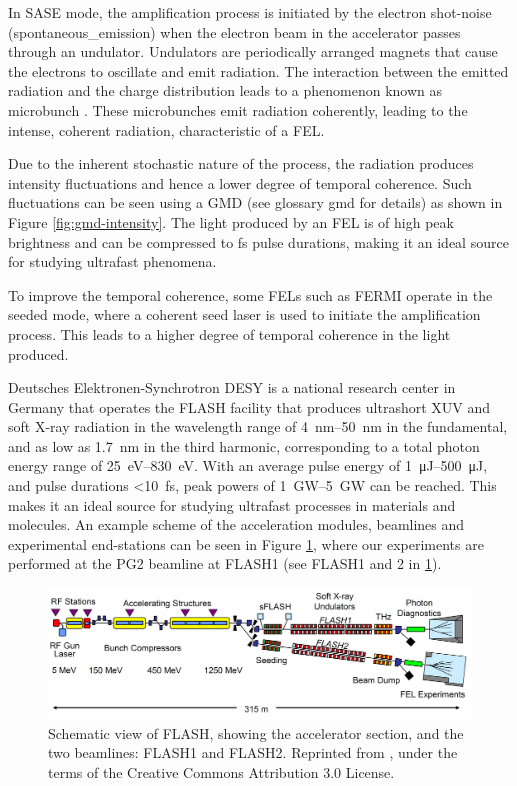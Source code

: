 In \gls{SASE} mode, the amplification process is initiated by the electron shot-noise (\gls{spontaneous_emission}) when the electron beam in the accelerator passes through an undulator. Undulators are periodically arranged magnets that cause the electrons to oscillate and emit radiation. The interaction between the emitted radiation and the charge distribution leads to a phenomenon known as \gls{microbunch} \cite{ackermannOperationFreeelectronLaser2007}. These microbunches emit radiation coherently, leading to the intense, coherent radiation, characteristic of a \gls{FEL}. 

Due to the inherent stochastic nature of the process, the radiation produces intensity fluctuations and hence a lower degree of temporal coherence. Such fluctuations can be seen using a \gls{GMD} (see glossary \gls{gmd} for details) as shown in Figure \ref{fig:gmd-intensity}. The light produced by an \gls{FEL} is of high peak brightness and can be compressed to \unit{fs} pulse durations, making it an ideal source for studying ultrafast phenomena.

To improve the temporal coherence, some \glspl{FEL} such as FERMI \cite{svandrlikDevelopmentPerspectivesFERMI2017} operate in the seeded mode, where a coherent seed laser is used to initiate the amplification process. This leads to a higher degree of temporal coherence in the light produced.

Deutsches Elektronen-Synchrotron DESY is a national research center in Germany that operates the \gls{FLASH} facility \cite{ackermannOperationFreeelectronLaser2007,tiedtkeSoftXrayFreeelectron2009} that produces ultrashort \gls{XUV} and soft X-ray radiation in the wavelength range of \qtyrange{4}{50}{\nm} in the fundamental, and as low as \qty{1.7}{\nm} in the third harmonic, corresponding to a total photon energy range of \qtyrange{25}{830}{\eV}. With an average pulse energy of \qtyrange{1}{500}{\micro\joule}, and pulse durations \qty{<10}{\fs}, peak powers of \qtyrange{1}{5}{\giga\watt} can be reached. This makes it an ideal source for studying ultrafast processes in materials and molecules. An example scheme of the acceleration modules, \glspl{beamline} and experimental end-stations can be seen in Figure \ref{fig:flash-schematic}, where our experiments are performed at the PG2 beamline at FLASH1 (see FLASH1 and 2 in \cref{fig:flash-schematic}).

\begin{figure}
    \includegraphics[width=1\linewidth]{images/flash_fel.png}
    \caption{Schematic view of \gls{FLASH}, showing the accelerator section, and the two beamlines: FLASH1 and FLASH2. Reprinted from \cite{faatzSimultaneousOperationTwo2016}, under the terms of the Creative Commons Attribution 3.0 License.}
    \label{fig:flash-schematic}
\end{figure}

